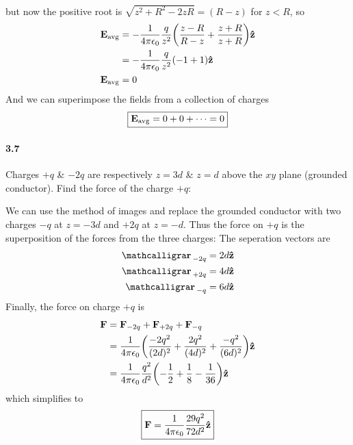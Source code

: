 \documentclass[../main.tex]{subfiles}
\begin{document}
\begin{enumerate}
\begin{align*}
    \end{align*}
    but now the positive root is $\sqrt{z^2 + R^2 - 2zR} = (R - z)$ for $z < R$, so
    \begin{align*}
        \vb E_\text{avg} &= -\ke \frac{q}{z^2} \qt(\frac{z - R}{R - z} + \frac{z + R}{z + R}) \vu z \\
        &= -\ke \frac{q}{z^2} \qt(-1 + 1) \vu z \\
        \vb E_\text{avg} &= 0
    \end{align*}
    And we can superimpose the fields from a collection of charges 
    \begin{align*}
        \boxed{
            \vb E_\text{avg} = 0 + 0 + \cdots = 0
        }
    \end{align*}
\end{enumerate}

\newpage
\paragraph{3.7} Charges $+q$ \& $-2q$ are respectively $z = 3d$ \& $z = d$ above the $xy$ plane (grounded conductor). Find the force of the charge $+q$:

We can use the method of images and replace the grounded conductor with two charges $-q$ at $z = -3d$ and $+2q$ at $z = -d$. 
Thus the force on $+q$ is the superposition of the forces from the three charges:
The seperation vectors are 
\begin{align*}
    \vb \scriptr_{-2q} &= 2d \vu z \\
    \vb \scriptr_{+2q} &= 4d \vu z \\
    \vb \scriptr_{-q} &= 6d \vu z
\end{align*}
Finally, the force on charge $+q$ is
\begin{align*}
    \vb F &= \vb F_{-2q} + \vb F_{+2q} + \vb F_{-q} \\
    &= \ke \qt(
        \frac{-2q^2}{(2d)^2} + \frac{2q^2}{(4d)^2} + \frac{-q^2}{(6d)^2}
    ) \vu z \\
    &= \ke \frac{q^2}{d^2} \qt(-\frac{1}{2} + \frac{1}{8} - \frac{1}{36}) \vu z
\end{align*}
which simplifies to
\begin{align*}
    \boxed{
        \vb F = \frac{1}{4\pi\epsilon_0} \frac{29q^2}{72d^2} \vu z
    }
\end{align*}

\newpage
\end{document}
